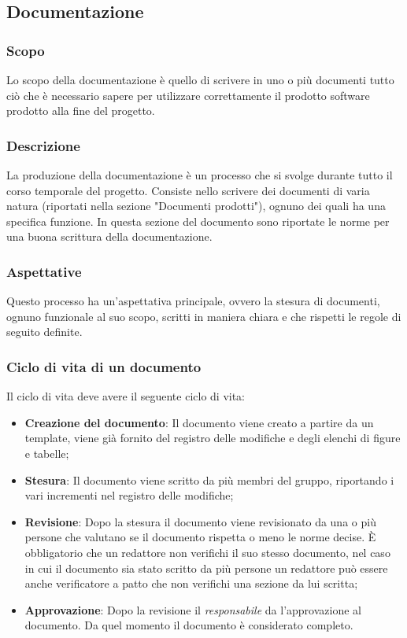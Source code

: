 \documentclass[../norme-di-progetto.tex]{subfiles}
\begin{document}
\subsection{Documentazione}

\subsubsection{Scopo}
Lo scopo della documentazione è quello di scrivere in uno o più documenti tutto ciò che è necessario sapere per utilizzare correttamente il prodotto software prodotto alla fine del progetto.

\subsubsection{Descrizione}
La produzione della documentazione è un processo che si svolge durante tutto il corso temporale del progetto. Consiste nello scrivere dei documenti di varia natura (riportati nella sezione "Documenti prodotti"), ognuno dei quali ha una specifica funzione. In questa sezione del documento sono riportate le norme per una buona scrittura della documentazione.

\subsubsection{Aspettative}
Questo processo ha un'aspettativa principale,  ovvero la stesura di documenti, ognuno funzionale al suo scopo, scritti in maniera chiara e che rispetti le regole di seguito definite.

\subsubsection{Ciclo di vita di un documento}
Il ciclo di vita deve avere il seguente ciclo di vita:
\begin{itemize}
    \item \textbf{Creazione del documento}: Il documento viene creato a partire da un template, viene già fornito del registro delle modifiche e degli elenchi di figure e tabelle;
    \item \textbf{Stesura}: Il documento viene scritto da più membri del gruppo, riportando i vari incrementi nel registro delle modifiche;
    \item \textbf{Revisione}: Dopo la stesura il documento viene revisionato da una o più persone che valutano se il documento rispetta o meno le norme decise. È obbligatorio che un redattore non verifichi il suo stesso documento, nel caso in cui il documento sia stato scritto da più persone un redattore può essere anche verificatore a patto che non verifichi una sezione da lui scritta;
    \item \textbf{Approvazione}: Dopo la revisione il \emph{responsabile} da l'approvazione al documento. Da quel momento il documento è considerato completo.
\end{itemize}
\end{document}
